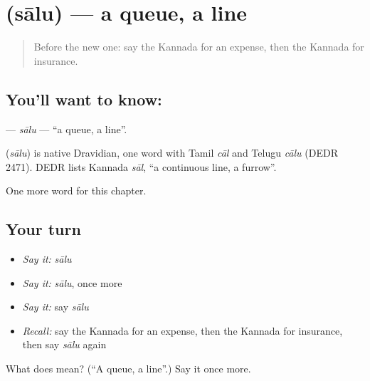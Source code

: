 \section[\texorpdfstring{\kn{ಸಾಲು} (sālu)}{ಸಾಲು (sālu)}]{ (sālu) — a queue, a line}

\label{lesson:KA-C232-salu}



\begin{quote}
Before the new one: say the Kannada for an expense, then the Kannada for insurance.
\end{quote}

\subsection*{You'll want to know: }
\textbf{} — \emph{sālu} — \textquotedblleft{}a queue, a line\textquotedblright{}.

\begin{cousinweb}
\textbf{} (\emph{sālu}) is native Dravidian, one word with Tamil \emph{cāl} and Telugu \emph{cālu} (DEDR 2471). DEDR lists Kannada \emph{sāl}, \textquotedblleft{}a continuous line, a furrow\textquotedblright{}.
\end{cousinweb}

\begin{grammarlens}[title={What you've built}]
One more word for this chapter.
\end{grammarlens}

\subsection*{Your turn}
\begin{itemize}
\raggedright
  \item \emph{Say it:} \emph{sālu}
  \item \emph{Say it:} \emph{sālu}, once more
  \item \emph{Say it:} say \emph{sālu}
  \item \emph{Recall:} say the Kannada for an expense, then the Kannada for insurance, then say \emph{sālu} again
\end{itemize}

\begin{tcolorbox}[breakable,colback=teal!4,colframe=teal!35!black,title={Before you move on}]
What does  mean? (\textquotedblleft{}A queue, a line\textquotedblright{}.) Say it once more.
\end{tcolorbox}
